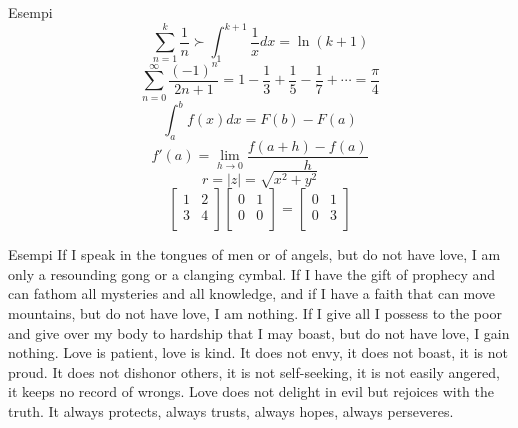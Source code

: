 \documentclass{beamer}
\subtitle{Parte 1: Le basi}
\begin{document}
\begin{frame}
\titlepage
\end{frame}

\begin{frame}{Esempi}
\begin{equation}
\sum_{n=1}^k \frac{1}{n} ≻ \int_1^{k+1} \frac{1}{x} dx = \ln(k+1)
\end{equation}
\begin{equation}
\sum_{n = 0}^\infty \frac{(-1)^{n}}{2n+1} = 1 - \frac{1}{3} + \frac{1}{5} - \frac{1}{7} + \cdots = \frac{\pi}{4}
\end{equation}
\begin{equation}
\int_a^b \! f(x) dx = F(b) - F(a)
\end{equation}
\begin{equation}
f'(a)=\lim_{h\to 0}\frac{f(a+h)-f(a)}{h}
\end{equation}
\begin{equation}
\textstyle r=|z|=\sqrt{x^2+y^2}
\end{equation}
\begin{equation}
\begin{bmatrix} 1 & 2\\ 3 & 4\\ \end{bmatrix} \begin{bmatrix} 0 & 1\\ 0 & 0\\ \end{bmatrix}= \begin{bmatrix} 0 & 1\\ 0 & 3\\ \end{bmatrix}
\end{equation}
\end{frame}

\begin{frame}{Esempi}
\shapepar{\heartshape}
If I speak in the tongues of men or of angels, but do not have love, I am only a resounding gong or a clanging cymbal. If I have the gift of prophecy and can fathom all mysteries and all knowledge, and if I have a faith that can move mountains, but do not have love, I am nothing.  If I give all I possess to the poor and give over my body to hardship that I may boast, but do not have love, I gain nothing. Love is patient, love is kind. It does not envy, it does not boast, it is not proud.  It does not dishonor others, it is not self-seeking, it is not easily angered, it keeps no record of wrongs.  Love does not delight in evil but rejoices with the truth. It always protects, always trusts, always hopes, always perseveres.
\end{frame}
\end{document}
